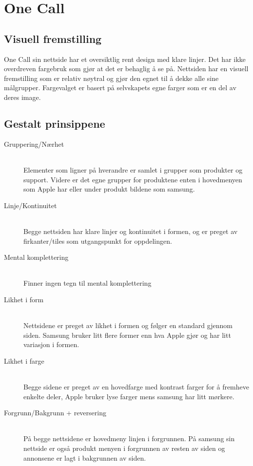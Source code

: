 \documentclass[a4paper, 10pt]{article}
\begin{document}
\section*{One Call}
\subsection*{Visuell fremstilling}
One Call sin nettside har et oversiktlig rent design med klare linjer. Det har ikke overdreven fargebruk som gjør at det er behaglig å se på. Nettsiden har en visuell fremstilling som er relativ nøytral og gjør den egnet til å dekke alle sine målgrupper. Fargevalget er basert på selvskapets egne farger som er en del av deres image.\\


\subsection{Gestalt prinsippene}

\begin{description}
  \item[Gruppering/Nærhet] \hfill \\
  Elementer som ligner på hverandre er samlet i grupper som produkter og support. Videre er det egne grupper for produktene enten i hovedmenyen som Apple har eller under produkt bildene som samsung.    
  \item[Linje/Kontinuitet] \hfill \\
  Begge nettsiden har klare linjer og kontinuitet i formen, og er preget av firkanter/tiles som utgangspunkt for oppdelingen.
  \item[Mental komplettering] \hfill \\
    Finner ingen tegn til mental komplettering
   \item[Likhet i form] \hfill \\
    Nettsidene er preget av likhet i formen og følger en standard gjennom siden. Samsung bruker litt flere former enn hva Apple gjør og har litt variasjon i formen.  
  \item[Likhet i farge] \hfill \\
    Begge sidene er preget av en hovedfarge med kontrast farger for å fremheve enkelte deler, Apple bruker lyse farger mens samsung har litt mørkere. 
    \newpage
  \item[Forgrunn/Bakgrunn + reversering] \hfill \\
    På begge nettsidene er hovedmeny linjen i forgrunnen. På samsung sin nettside er også produkt menyen i forgrunnen av resten av siden og annonsene er lagt i bakgrunnen av siden. 
\end{description}
\end{document}
